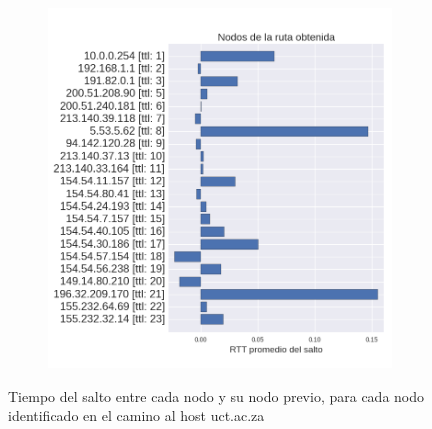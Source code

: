\begin{figure}[ht]
  \begin{subfigure}[b]{.5\textwidth}
    \includegraphics[width=\textwidth]{Imagenes/capetown_rtts.png}
  \end{subfigure}
  \label{fig:capetown_rtts}
  \caption{Tiempo del salto entre cada nodo y su nodo previo, para cada nodo identificado en el camino al host uct.ac.za}
\end{figure}

